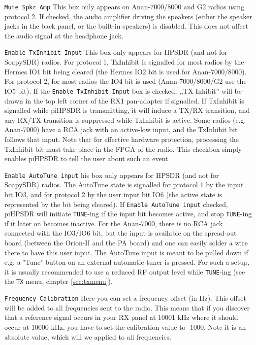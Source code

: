 \documentclass[12pt]{book}
\def\rett#1{\texttt{\color{red}#1}}
\def\bltt#1{\texttt{\color{blue}#1}}
\def\pH{pi\-HPSDR\xspace}
\begin{document}
\rett{Mute Spkr Amp} This box only appears on Anan-7000/8000 and G2 radios using protocol 2.
If checked, the audio amplifier driving the speakers (either the speaker jacks in the
back panel, or the built-in speakers) is disabled. This does not affect the audio signal
at the headphone jack.

\rett{Enable TxInhibit Input} This box only appears for HPSDR (and not for SoapySDR)
radios.
For  protocol 1, TxInhibit is signalled for most radios by the Hermes IO1 bit being
cleared (the Hermes IO2 bit is used for Anan-7000/8000). For protocol 2, for most
radios the IO4 bit is used (Anan-7000/8000/G2 use the IO5 bit).
If the \rett{Enable TxInhibit Input} box is checked, ,,TX Inhibit'' will be drawn
in the top left corner of the RX1 pan-adapter if signalled. If TxInhibit is signalled
while \pH is transmitting, it will induce a TX/RX transition, and any RX/TX
transition is suppressed while TxInhibit is active. Some radios (e.g. Anan-7000) have
a RCA jack with an active-low input, and the TxInhibit bit follows that input.
Note that for effective hardware protection, processing the TxInhibit bit must
take place in the FPGA of the radio. This checkbox simply enables \pH to tell
the user about such an event.

\rett{Enable AutoTune  input} his box only appears for HPSDR (and not for SoapySDR)
radios. The AutoTune state is signalled for protocol 1 by the input bit IO3,
and for protocol 2 by the user input bit IO6 (the active state is represented
by the bit being cleared).
If \rett{Enable AutoTune  input} checked, \pH will initiate \bltt{TUNE}-ing if the
input bit becomes active, and stop \bltt{TUNE}-ing if it later on becomes inactive.
For the Anan-7000, there is no RCA jack connected with the IO3/IO6 bit, but the
input is available on the spread-out board (between the Orion-II and the PA board) and one
can easily solder a wire there to have this user input. The AutoTune input is meant to
be pulled down if e.g. a "Tune" button on an external automatic tuner is pressed.
For such a setup, it is usually recommended to use a reduced RF output level while
\bltt{TUNE}-ing  (see the \bltt{TX} menu, chapter \ref{sec:txmenu}).


\rett{Frequency Calibration} Here you can set a frequency offset (in Hz). This offset
will be added to all frequencies sent to the radio. This means that if you discover that
a reference signal occurs in your RX panel at 10001 kHz where it should occur at 10000
kHz, you have to set the calibration value to -1000. Note it is an absolute value,
which will we applied to all frequencies.
\end{document}
